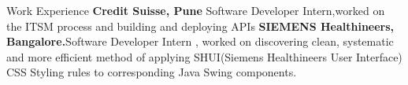 \begin{rubric}{Work Experience}
%
	\textbf{Credit Suisse, Pune} Software Developer Intern,worked on the ITSM process and building and deploying APIs
%
%
%
	\textbf{SIEMENS Healthineers, Bangalore.}Software Developer Intern , worked on discovering clean, systematic and more efficient method of applying SHUI(Siemens Healthineers User Interface) CSS Styling rules to corresponding Java Swing components. 
%
\end{rubric}